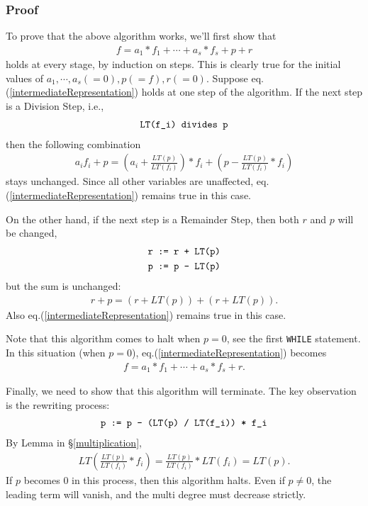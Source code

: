 \documentclass[11pt]{book}
\begin{document}
\subsubsection{Proof}
To prove that the above algorithm works, we'll first show that
\begin{eqnarray}
\label{intermediateRepresentation}
f = a_1*f_1 + \cdots + a_s * f_s + p + r
\end{eqnarray}
holds at every stage, by induction on steps.
This is clearly true for the initial values of $a_1, \cdots, a_s (= 0),p(=f),r(=0)$.
Suppose eq.(\ref{intermediateRepresentation}) holds at one step of the algorithm.
If the next step is a Division Step, i.e.,
\begin{eqnarray}
\verb|LT(f_i) divides p|
\end{eqnarray}
then the following combination
\begin{eqnarray}
a_i f_i + p = \left(a_i + \frac{LT(p)}{LT(f_i)} \right) * f_i + \left(p - \frac{LT(p)}{LT(f_i)}* f_i \right)
\end{eqnarray}
stays unchanged.
Since all other variables are unaffected, eq.(\ref{intermediateRepresentation}) remains true in this case.

On the other hand, if the next step is a Remainder Step, then both $r$ and $p$ will be changed, 
\begin{eqnarray}
\verb|r := r + LT(p)| \\
\verb|p := p - LT(p)|
\end{eqnarray}
but the sum is unchanged:
\begin{eqnarray}
r+p = \left(r + LT(p) \right) + \left( r + LT(p)\right).
\end{eqnarray}
Also eq.(\ref{intermediateRepresentation}) remains true in this case.

Note that this algorithm comes to halt when $p=0$, see the first \verb|WHILE| statement.
In this situation (when $p=0$), eq.(\ref{intermediateRepresentation}) becomes
\begin{eqnarray}
f = a_1*f_1 + \cdots + a_s * f_s + r.
\end{eqnarray}

Finally, we need to show that this algorithm will terminate.
The key observation is the rewriting process:
\begin{eqnarray}
\verb| p := p - (LT(p) / LT(f_i)) * f_i |
\end{eqnarray}
By Lemma in \S\ref{multiplication},
\begin{eqnarray}
LT \left( \frac{LT(p)}{LT(f_i)} * f_i \right) = \frac{LT(p)}{LT(f_i)} * LT(f_i) = LT(p).
\end{eqnarray}
If $p$ becomes $0$ in this process, then this algorithm halts.
Even if $p \neq 0$, the leading term will vanish, and the multi degree must decrease strictly.
\end{document}

